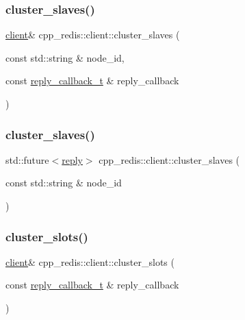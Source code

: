 \subsubsection{\texorpdfstring{cluster\+\_\+slaves()}{cluster\_slaves()}\hspace{0.1cm}{\footnotesize\ttfamily [1/2]}}
{\footnotesize\ttfamily \hyperlink{classcpp__redis_1_1client}{client}\& cpp\+\_\+redis\+::client\+::cluster\+\_\+slaves (\begin{DoxyParamCaption}\item[{const std\+::string \&}]{node\+\_\+id,  }\item[{const \hyperlink{classcpp__redis_1_1client_a061a1140d36d2eaeda82b09a0bb3f9f2}{reply\+\_\+callback\+\_\+t} \&}]{reply\+\_\+callback }\end{DoxyParamCaption})}

\mbox{\label{classcpp__redis_1_1client_afbfca7fb91f492768c7ac75677f433a2}} 
\subsubsection{\texorpdfstring{cluster\+\_\+slaves()}{cluster\_slaves()}\hspace{0.1cm}{\footnotesize\ttfamily [2/2]}}
{\footnotesize\ttfamily std\+::future$<$\hyperlink{classcpp__redis_1_1reply}{reply}$>$ cpp\+\_\+redis\+::client\+::cluster\+\_\+slaves (\begin{DoxyParamCaption}\item[{const std\+::string \&}]{node\+\_\+id }\end{DoxyParamCaption})}

\mbox{\label{classcpp__redis_1_1client_a7d0dad34ca2fe2e301b202388bb47e10}} 
\subsubsection{\texorpdfstring{cluster\+\_\+slots()}{cluster\_slots()}\hspace{0.1cm}{\footnotesize\ttfamily [1/2]}}
{\footnotesize\ttfamily \hyperlink{classcpp__redis_1_1client}{client}\& cpp\+\_\+redis\+::client\+::cluster\+\_\+slots (\begin{DoxyParamCaption}\item[{const \hyperlink{classcpp__redis_1_1client_a061a1140d36d2eaeda82b09a0bb3f9f2}{reply\+\_\+callback\+\_\+t} \&}]{reply\+\_\+callback }\end{DoxyParamCaption})}

